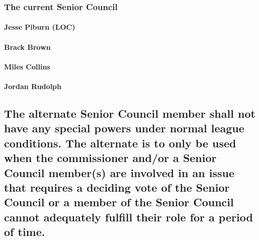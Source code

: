 \documentclass[]{book}
\let\oldparagraph\paragraph
\renewcommand{\paragraph}[1]{\oldparagraph{#1}\mbox{}}
\begin{document}
\hypertarget{the-current-senior-council}{%
\subsubsection{The current Senior Council}\label{the-current-senior-council}}

\hypertarget{jesse-piburn-loc}{%
\paragraph{Jesse Piburn (LOC)}\label{jesse-piburn-loc}}

\hypertarget{brack-brown}{%
\paragraph{Brack Brown}\label{brack-brown}}

\hypertarget{miles-collins}{%
\paragraph{Miles Collins}\label{miles-collins}}

\hypertarget{jordan-rudolph}{%
\paragraph{Jordan Rudolph}\label{jordan-rudolph}}

\hypertarget{the-alternate-senior-council-member-shall-not-have-any-special-powers-under-normal-league-conditions.-the-alternate-is-to-only-be-used-when-the-commissioner-andor-a-senior-council-members-are-involved-in-an-issue-that-requires-a-deciding-vote-of-the-senior-council-or-a-member-of-the-senior-council-cannot-adequately-fulfill-their-role-for-a-period-of-time.}{%
\subsection{The alternate Senior Council member shall not have any special powers under normal league conditions. The alternate is to only be used when the commissioner and/or a Senior Council member(s) are involved in an issue that requires a deciding vote of the Senior Council or a member of the Senior Council cannot adequately fulfill their role for a period of time.}\label{the-alternate-senior-council-member-shall-not-have-any-special-powers-under-normal-league-conditions.-the-alternate-is-to-only-be-used-when-the-commissioner-andor-a-senior-council-members-are-involved-in-an-issue-that-requires-a-deciding-vote-of-the-senior-council-or-a-member-of-the-senior-council-cannot-adequately-fulfill-their-role-for-a-period-of-time.}}
\end{document}
